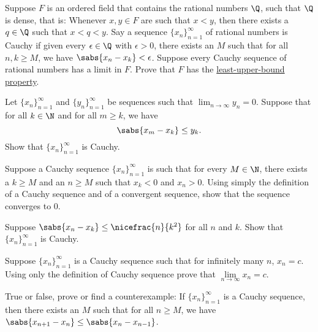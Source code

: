 \begin{exercise}[Challenging]
Suppose $F$ is an ordered field that contains the rational numbers
$\Q$, such that $\Q$ is dense,
that is: Whenever $x,y \in F$ are such that $x < y$,
then there exists a $q \in \Q$ such that $x < q < y$.
Say a sequence $\{ x_n \}_{n=1}^\infty$ of rational numbers is Cauchy
if given every $\epsilon \in \Q$ with $\epsilon > 0$, there exists
an $M$ such that for all $n,k \geq M$, we have $\sabs{x_n-x_k} < \epsilon$.
Suppose every Cauchy sequence of rational numbers has a limit in $F$.
Prove that $F$ has the \hyperref[defn:lub]{least-upper-bound property}.
\end{exercise}

\begin{exercise}
Let $\{ x_n \}_{n=1}^\infty$ and $\{ y_n \}_{n=1}^\infty$ be sequences such
that $\lim_{n\to\infty} y_n =0$.  Suppose that for all $k \in \N$
and
for all $m \geq k$, we have
\begin{equation*}
\sabs{x_m-x_k} \leq y_k .
\end{equation*}
Show that $\{ x_n \}_{n=1}^\infty$ is Cauchy.
\end{exercise}

\begin{exercise}
Suppose a Cauchy sequence $\{ x_n \}_{n=1}^\infty$ is such that for every $M \in \N$,
there exists a $k \geq M$ and an $n \geq M$ such that
$x_k < 0$ and $x_n > 0$.  Using simply the definition of a Cauchy sequence
and of a convergent sequence, show that
the sequence converges to $0$.
\end{exercise}

\begin{exercise}
Suppose $\sabs{x_n-x_k} \leq \nicefrac{n}{k^2}$ for all $n$ and $k$.
Show that $\{ x_n \}_{n=1}^\infty$ is Cauchy.
\end{exercise}

\begin{exercise}
Suppose $\{ x_n \}_{n=1}^\infty$ is a Cauchy sequence such that for infinitely many
$n$, $x_n = c$.  Using only the definition of Cauchy sequence prove 
that $\lim\limits_{n\to\infty} x_n = c$.
\end{exercise}

\begin{exercise}
True or false, prove or find a counterexample:  If $\{ x_n \}_{n=1}^\infty$ is a Cauchy
sequence, then there exists an $M$
such that for all $n \geq M$, we have
$\sabs{x_{n+1}-x_n}
\leq
\sabs{x_{n}-x_{n-1}}$.
\end{exercise}


